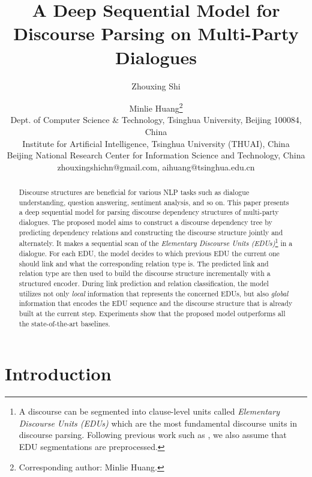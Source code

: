 \documentclass[letterpaper]{article} \usepackage{aaai19}  \usepackage{times}  \usepackage{helvet}  \usepackage{courier}  \usepackage{url}  \usepackage{graphicx}  \usepackage{amssymb}
\begin{document}
\title{A Deep Sequential Model for Discourse Parsing on Multi-Party Dialogues}
\author{
Zhouxing Shi \and Minlie Huang\thanks{Corresponding author: Minlie Huang.}\\
Dept. of Computer Science \& Technology, Tsinghua University, Beijing 100084, China\\
Institute for Artificial Intelligence, Tsinghua University (THUAI), China\\
Beijing National Research Center for Information Science and Technology, China\\
zhouxingshichn@gmail.com,
aihuang@tsinghua.edu.cn
}
\maketitle
\begin{abstract}
Discourse structures are beneficial for various NLP tasks such as dialogue understanding, question answering, sentiment analysis, and so on. This paper presents a deep sequential model for parsing discourse dependency structures of multi-party dialogues. The proposed model aims to construct a discourse dependency tree by predicting dependency relations and constructing the discourse structure jointly and alternately. It makes a sequential scan of the \emph{Elementary Discourse Units (EDUs)}\footnote{A discourse can be segmented into clause-level units called \emph{Elementary Discourse Units (EDUs)} which are the most fundamental discourse units in discourse parsing. Following previous work such as \cite{li2014text,li2014recursive}, we also assume that EDU segmentations are preprocessed.}
in a dialogue. For each EDU, the model decides to which previous EDU the current one should link and what the corresponding relation type is. The predicted link and relation type are then used to build the discourse structure incrementally with a structured encoder. During link prediction and relation classification, the model utilizes not only \textit{local} information that represents the concerned EDUs, but also \textit{global} information that encodes the EDU sequence and the discourse structure that is already built at the current step. Experiments show that the proposed model outperforms all the state-of-the-art baselines.

\end{abstract}

\section{Introduction}
\end{document}

